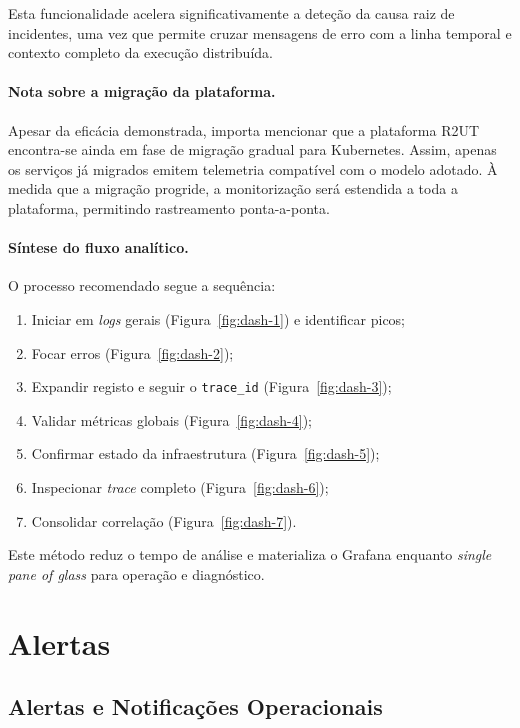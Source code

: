 Esta funcionalidade acelera significativamente a deteção da causa raiz de incidentes, 
uma vez que permite cruzar mensagens de erro com a linha temporal e contexto completo 
da execução distribuída.

\paragraph{Nota sobre a migração da plataforma.}
Apesar da eficácia demonstrada, importa mencionar que a plataforma R2UT encontra-se ainda 
em fase de migração gradual para Kubernetes. Assim, apenas os serviços já migrados 
emitem telemetria compatível com o modelo adotado. À medida que a migração progride, a 
monitorização será estendida a toda a plataforma, permitindo rastreamento ponta-a-ponta.

\paragraph{Síntese do fluxo analítico.}
O processo recomendado segue a sequência:

\begin{enumerate}
\item Iniciar em \textit{logs} gerais (Figura~\ref{fig:dash-1}) e identificar picos;
\item Focar erros (Figura~\ref{fig:dash-2});
\item Expandir registo e seguir o \texttt{trace\_id} (Figura~\ref{fig:dash-3});
\item Validar métricas globais (Figura~\ref{fig:dash-4});
\item Confirmar estado da infraestrutura (Figura~\ref{fig:dash-5});
\item Inspecionar \textit{trace} completo (Figura~\ref{fig:dash-6});
\item Consolidar correlação (Figura~\ref{fig:dash-7}).
\end{enumerate}

Este método reduz o tempo de análise e materializa o Grafana enquanto \textit{single pane of glass} 
para operação e diagnóstico.


\section{Alertas}


\subsection{Alertas e Notificações Operacionais}

